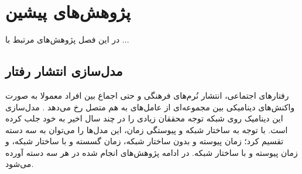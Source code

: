 \chapter{پژوهش‌های پیشین}\label{Chap:Chap2}

 در این فصل پژوهش‌های مرتبط  با ... 

\section{مدل‌سازی انتشار رفتار}
رفتارهای اجتماعی، انتشار نُرم‌های فرهنگی و حتی اجماع بین افراد معمولا به صورت واکنش‌های دینامیکی بین مجموعه‌ای از عامل‌های به هم متصل رخ می‌دهد \cite{Vespignani2012}.  مدل‌‌سازی این دینامیک روی شبکه توجه محققان زیادی را در چند سال اخیر به خود جلب کرده است.  با توجه به ساختار شبکه و پیوستگی زمان، این مدل‌ها را می‌توان به سه دسته تقسیم کرد؛ زمان پیوسته و بدون ساختار شبکه، زمان گسسته و با ساختار شبکه، و زمان پیوسته و با ساختار شبکه.  در ادامه پژوهش‌های انجام شده در هر سه دسته آورده می‌شود.



